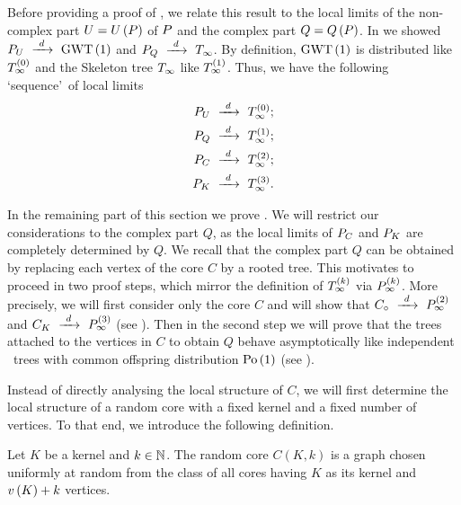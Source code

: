 Before providing a proof of , we relate this result to the local limits of the non-complex part $U=U\left(P\right)$ of $P$ and the complex part $Q=Q\left(P\right)$. In  we showed $P_U~\xrightarrow{~d~}~\operatorname{GWT}\left(1\right)$ and  $P_Q~\xrightarrow{~d~}~T_\infty$. By definition, $\operatorname{GWT}\left(1\right)$ is distributed like $T_\infty^{\left(0\right)}$ and the Skeleton tree $T_\infty$ like $T_\infty^{\left(1\right)}$. Thus, we have the following \lq sequence\rq\ of local limits
\begin{align*}
P_U~\xrightarrow{~d~}~T_\infty^{\left(0\right)};\\
P_Q~\xrightarrow{~d~}~T_\infty^{\left(1\right)};\\
P_C~\xrightarrow{~d~}~T_\infty^{\left(2\right)};\\ P_K~\xrightarrow{~d~}~T_\infty^{\left(3\right)}.
\end{align*}

In the remaining part of this section we prove . We will restrict our considerations to the complex part $Q$, as the local limits of $P_C$ and $P_K$ are completely determined by $Q$. We recall that the complex part $Q$ can be obtained by replacing each vertex of the core $C$ by a rooted tree. This motivates to proceed in two proof steps, which mirror the definition of $T_\infty^{\left(k\right)}$ via $P_{\infty}^{\left(k\right)}$. More precisely, we will first consider only the core $C$ and will show that $C_\circ~\xrightarrow{~d~}~P_{\infty}^{\left(2\right)}$ and $C_K~\xrightarrow{~d~}~P_{\infty}^{\left(3\right)}$ (see ). Then in the second step we will prove that the trees attached to the vertices in $C$ to obtain $Q$ behave asymptotically like independent \GW\ trees with common offspring distribution $\operatorname{Po}\left(1\right)$ (see ). 

Instead of directly analysing the local structure of $C$, we will first determine the local structure of a random core with a fixed kernel and a fixed number of vertices. To that end, we introduce the following definition. 

\begin{definition}\label{LSdef:random_core}
	Let $K$ be a kernel and $k\in\mathbb{N}$. The random core $C(K,k)$ is a graph chosen uniformly at random from the class of all cores having $K$ as its kernel and $v\left({K}\right)+k$ vertices. 
\end{definition}

